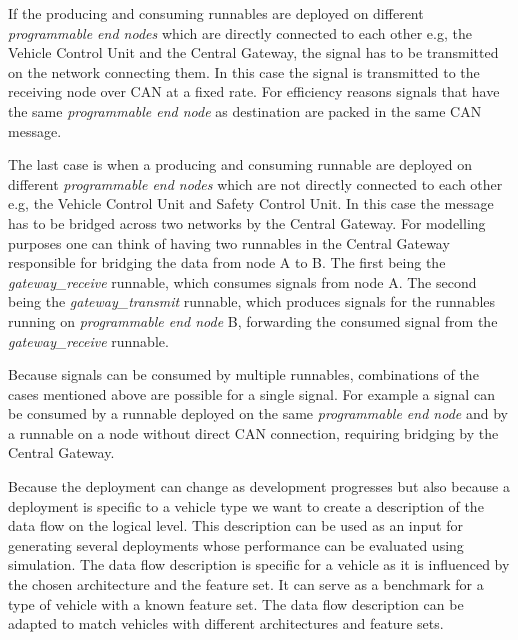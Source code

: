 If the producing and consuming runnables are deployed on different \textit{programmable end nodes} which are directly connected to each other e.g, the Vehicle Control Unit and the Central Gateway, the signal has to be transmitted on the network connecting them. In this case the signal is transmitted to the receiving node over CAN at a fixed rate. For efficiency reasons signals that have the same \textit{programmable end node} as destination are packed in the same CAN message.

The last case is when a producing and consuming runnable are deployed on different \textit{programmable end nodes} which are not directly connected to each other e.g, the Vehicle Control Unit and Safety Control Unit. In this case the message has to be bridged across two networks by the Central Gateway. For modelling purposes one can think of having two runnables in the Central Gateway responsible for bridging the data from node A to B. The first being the \textit{gateway\_receive} runnable, which consumes signals from node A. The second being the \textit{gateway\_transmit} runnable, which produces signals for the runnables running on \textit{programmable end node} B, forwarding the consumed signal from the \textit{gateway\_receive} runnable.

Because signals can be consumed by multiple runnables, combinations of the cases mentioned above are possible for a single signal. For example a signal can be consumed by a runnable deployed on the same \textit{programmable end node} and by a runnable on a node without direct CAN connection, requiring bridging by the Central Gateway.

Because the deployment can change as development progresses but also because a deployment is specific to a vehicle type we want to create a description of the data flow on the logical level. This description can be used as an input for generating several deployments whose performance can be evaluated using simulation. The data flow description is specific for a vehicle as it is influenced by the chosen architecture and the feature set. It can serve as a benchmark for a type of vehicle with a known feature set. The data flow description can be adapted to match vehicles with different architectures and feature sets. 

